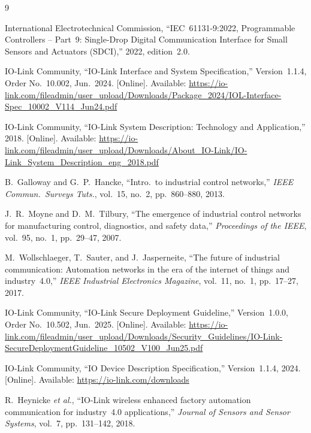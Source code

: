 \documentclass[conference]{IEEEtran}
\begin{document}
\begin{thebibliography}{9}

International Electrotechnical Commission, ``IEC~61131-9:2022,
Programmable Controllers -- Part~9: Single-Drop Digital Communication
Interface for Small Sensors and Actuators (SDCI),'' 2022, edition~2.0.

IO-Link Community, ``IO-Link Interface and System Specification,''
Version~1.1.4, Order No.~10.002, Jun.~2024. [Online]. Available:
\url{https://io-link.com/fileadmin/user_upload/Downloads/Package_2024/IOL-Interface-Spec_10002_V114_Jun24.pdf}

IO-Link Community, ``IO-Link System Description: Technology and
Application,'' 2018. [Online]. Available:
\url{https://io-link.com/fileadmin/user_upload/Downloads/About_IO-Link/IO-Link_System_Description_eng_2018.pdf}

B.~Galloway and G.~P.~Hancke, ``Intro.\ to industrial control
networks,'' \textit{IEEE Commun.\ Surveys Tuts.},
vol.~15, no.~2, pp.~860--880, 2013.

J.~R.~Moyne and D.~M.~Tilbury, ``The emergence of industrial control
networks for manufacturing control, diagnostics, and safety data,''
\textit{Proceedings of the IEEE}, vol.~95, no.~1, pp.~29--47, 2007.

M.~Wollschlaeger, T.~Sauter, and J.~Jasperneite, ``The future of
industrial communication: Automation networks in the era of the internet
of things and industry~4.0,'' \textit{IEEE Industrial Electronics
Magazine}, vol.~11, no.~1, pp.~17--27, 2017.

IO-Link Community, ``IO-Link Secure Deployment Guideline,''
Version~1.0.0, Order No.~10.502, Jun.~2025. [Online]. Available:
\url{https://io-link.com/fileadmin/user_upload/Downloads/Security_Guidelines/IO-Link-SecureDeploymentGuideline_10502_V100_Jun25.pdf}

IO-Link Community, ``IO Device Description Specification,''
Version~1.1.4, 2024. [Online]. Available:
\url{https://io-link.com/downloads}

R.~Heynicke \textit{et al.}, ``IO-Link wireless enhanced factory
automation communication for industry~4.0 applications,'' \textit{Journal
of Sensors and Sensor Systems}, vol.~7, pp.~131--142, 2018.

\end{thebibliography}
\end{document}
